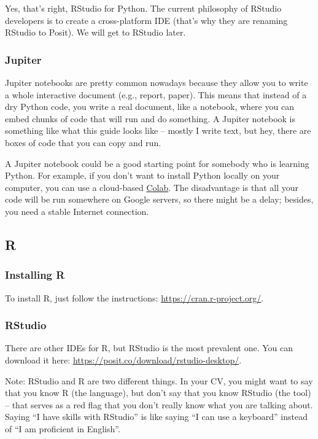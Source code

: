 \documentclass[
  11pt,
]{article}
\begin{document}
Yes, that's right, RStudio for Python. The current philosophy of RStudio developers is to create a cross-platform IDE (that's why they are renaming RStudio to Posit). We will get to RStudio later.

\subsubsection{Jupiter}\label{jupiter}

Jupiter notebooks are pretty common nowadays because they allow you to write a whole interactive document (e.g., report, paper). This means that instead of a dry Python code, you write a real document, like a notebook, where you can embed chunks of code that will run and do something. A Jupiter notebook is something like what this guide looks like -- mostly I write text, but hey, there are boxes of code that you can copy and run.

A Jupiter notebook could be a good starting point for somebody who is learning Python. For example, if you don't want to install Python locally on your computer, you can use a cloud-based \href{https://colab.research.google.com/}{Colab}. The disadvantage is that all your code will be run somewhere on Google servers, so there might be a delay; besides, you need a stable Internet connection.

\subsection{R}\label{r}

\subsubsection{Installing R}\label{installing-r}

To install R, just follow the instructions: \url{https://cran.r-project.org/}.

\subsubsection{RStudio}\label{rstudio-1}

There are other IDEs for R, but RStudio is the most prevalent one. You can download it here: \url{https://posit.co/download/rstudio-desktop/}.

Note: RStudio and R are two different things. In your CV, you might want to say that you know R (the language), but don't say that you know RStudio (the tool) -- that serves as a red flag that you don't really know what you are talking about. Saying ``I have skills with RStudio'' is like saying ``I can use a keyboard'' instead of ``I am proficient in English''.
\end{document}

